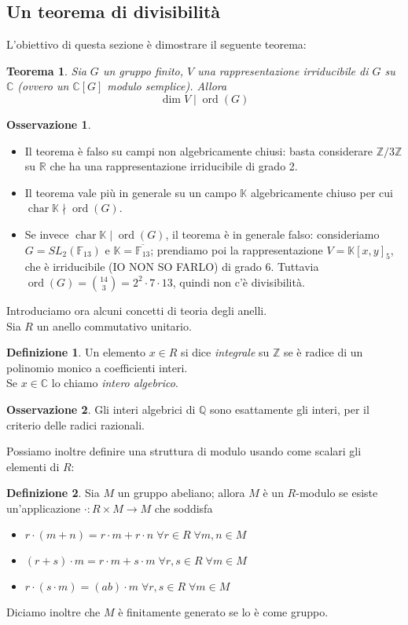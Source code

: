 \documentclass[11pt]{article}
\theoremstyle{plain}
\newtheorem{thm}{Teorema}[section]
\theoremstyle{definition}
\newtheorem{defn}{Definizione}[section]
\newtheorem*{rem}{Osservazione}
\theoremstyle{remark}
\newcommand{\C}{\mathbb{C}}
\newcommand{\R}{\mathbb{R}}
\newcommand{\K}{\mathbb{K}}
\newcommand{\Q}{\mathbb{Q}}
\newcommand{\Z}{\mathbb{Z}}
\DeclareMathOperator{\Char}{char}
\DeclareMathOperator{\ord}{ord}
\begin{document}
	
\subsection{Un teorema di divisibilità}
  L'obiettivo di questa sezione è dimostrare il seguente teorema:
  \begin{thm}\label{dim_mid_ordine}
    Sia $G$ un gruppo finito, $V$ una rappresentazione irriducibile di $G$ su $\C$ (ovvero un $\C[G]$ modulo semplice). Allora $$\dim V\mid  \ord(G)$$
  \end{thm}
  \begin{rem}$ $
   \begin{itemize}
    \item Il teorema è falso su campi non algebricamente chiusi: basta considerare $\Z/3\Z$ su $\R$ che ha una rappresentazione irriducibile di grado 2.
    \item Il teorema vale più in generale su un campo $\K$ algebricamente chiuso per cui $\Char \K \nmid \ord(G)$.
    \item Se invece $\Char \K\mid \ord(G)$, il teorema è in generale falso: consideriamo $G=SL_2(\mathbb F_{13})$ e $\K=\overline{\mathbb F_{13}}$; prendiamo poi la rappresentazione $V=\K[x,y]_5$, che è irriducibile (IO NON SO FARLO) di grado $6$. Tuttavia $\ord(G)=\binom{14}{3}=2^2\cdot7\cdot13$, quindi non c'è divisibilità.
   \end{itemize}
  \end{rem}
  Introduciamo ora alcuni concetti di teoria degli anelli.\\
  Sia $R$ un anello commutativo unitario.\\
  \begin{defn}
    Un elemento $x\in R$ si dice \textit{integrale} su $\Z$ se è radice di un polinomio monico a coefficienti interi.\\
    Se $x\in\C$ lo chiamo \textit{intero algebrico}.
  \end{defn}
  \begin{rem}\label{int_alg_raz}
   Gli interi algebrici di $\Q$ sono esattamente gli interi, per il criterio delle radici razionali.
  \end{rem}
  Possiamo inoltre definire una struttura di modulo usando come scalari gli elementi di $R$:
  \begin{defn}
   Sia $M$ un gruppo abeliano; allora $M$ è un $R$-modulo se esiste un'applicazione $\cdot:R\times M\to M$ che soddisfa
   \begin{itemize}
    \item $r\cdot(m+n)=r\cdot m+r\cdot n\;\forall r\in R\;\forall m,n\in M$
    \item $(r+s)\cdot m=r\cdot m+s\cdot m\;\forall r,s\in R\;\forall m\in M$
    \item $r\cdot(s\cdot m)=(ab)\cdot m\;\forall r,s\in R\;\forall m\in M$
   \end{itemize}
   Diciamo inoltre che $M$ è finitamente generato se lo è come gruppo.
  \end{defn}
\end{document}
